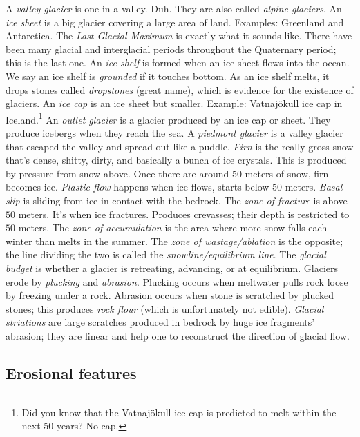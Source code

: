 \documentclass[11pt]{scrartcl}
\begin{document}
\begin{itemize}
	\ii A \emph{valley glacier} is one in a valley. Duh. They are also called \emph{alpine glaciers}.
	\ii An \emph{ice sheet} is a big glacier covering a large area of land. Examples: Greenland and Antarctica.
	\ii The \emph{Last Glacial Maximum} is exactly what it sounds like. There have been many glacial and interglacial periods throughout the Quaternary period; this is the last one.
	\ii An \emph{ice shelf} is formed when an ice sheet flows into the ocean. We say an ice shelf is \emph{grounded} if it touches bottom. As an ice shelf melts, it drops stones called \emph{dropstones} (great name), which is evidence for the existence of glaciers.
	\ii An \emph{ice cap} is an ice sheet but smaller. Example: Vatnaj\"okull ice cap in Iceland.\footnote{Did you know that the Vatnaj\"okull ice cap is predicted to melt within the next 50 years? No cap.}
	\ii An \emph{outlet glacier} is a glacier produced by an ice cap or sheet. They produce icebergs when they reach the sea.
	\ii A \emph{piedmont glacier} is a valley glacier that escaped the valley and spread out like a puddle.
	\ii \emph{Firn} is the really gross snow that's dense, shitty, dirty, and basically a bunch of ice crystals. This is produced by pressure from snow above. Once there are around $50$ meters of snow, firn becomes ice.
	\ii \emph{Plastic flow} happens when ice flows, starts below $50$ meters.
	\ii \emph{Basal slip} is sliding from ice in contact with the bedrock.
	\ii The \emph{zone of fracture} is above $50$ meters. It's when ice fractures. Produces crevasses; their depth is restricted to $50$ meters.
	\ii The \emph{zone of accumulation} is the area where more snow falls each winter than melts in the summer. The \emph{zone of wastage/ablation} is the opposite; the line dividing the two is called the \emph{snowline/equilibrium line}. The \emph{glacial budget} is whether a glacier is retreating, advancing, or at equilibrium.
	\ii Glaciers erode by \emph{plucking} and \emph{abrasion}. Plucking occurs when meltwater pulls rock loose by freezing under a rock. Abrasion occurs when stone is scratched by plucked stones; this produces \emph{rock flour} (which is unfortunately not edible). \emph{Glacial striations} are large scratches produced in bedrock by huge ice fragments' abrasion; they are linear and help one to reconstruct the direction of glacial flow.
\end{itemize}

\subsection{Erosional features}
\end{document}
